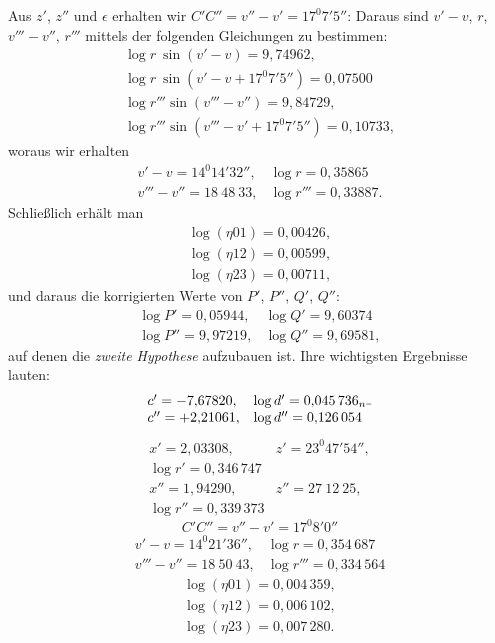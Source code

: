 Aus $z'$, $z''$ und $\epsilon$ erhalten wir $C'C'' = v''-v' = 17^{0}7'5''$: Daraus
sind $v'-v$, $r$, $v'''-v''$, $r'''$ mittels der folgenden Gleichungen zu bestimmen:
\[
\begin{array}{l}
\log r\ \sin(v'-v) = 9{,}74962, \\ \log r\ \sin(v'-v+17^{0}7'5'') = 0{,}07500 \\
\log r'''\sin(v'''-v'') = 9{,}84729, \\ \log r'''\sin(v'''-v'+17^{0}7'5'') = 0{,}10733,
\end{array}
\]
woraus wir erhalten
\[
\begin{array}{ll}
v'-v = 14^{0}14'32'', & \log r = 0{,}35865 \\
v'''-v'' = 18\ 48\ 33, & \log r''' = 0{,}33887.
\end{array}
\]
Schließlich erhält man
\[
\begin{gathered}
\log(\eta 01) = 0{,}00426, \\ \log(\eta 12) = 0{,}00599, \\ \log(\eta 23) = 0{,}00711,
\end{gathered}
\]
und daraus die korrigierten Werte von $P'$, $P''$, $Q'$, $Q''$:
\[
\begin{array}{ll}
\log P' = 0{,}05944, & \log Q' = 9{,}60374 \\
\log P'' = 9{,}97219, & \log Q'' = 9{,}69581,
\end{array}
\]
auf denen die \emph{zweite Hypothese} aufzubauen ist. Ihre wichtigsten Ergebnisse
lauten:
\[
\begin{array}{ll}
c' = -7{,}67820, & \log d' = 0{,}045\,736_n\mathord{\rule[.1ex]{.35em}{.35pt}} \\
c'' = +2{,}21061, & \log d'' = 0{,}126\,054
\end{array}
\]
\[
\begin{array}{ll}
x' = 2{,}03308, & z' = 23^{0}47'54'',\\
\log r' = 0{,}346\,747 & \\
x'' = 1{,}94290, & z'' = 27\ 12\ 25,\\
\log r'' = 0{,}339\,373 & 
\end{array}
\]
\[
C'C'' = v''-v' = 17^{0}8'0''
\]
\[
\begin{array}{ll}
v'-v = 14^{0}21'36'', & \log r = 0{,}354\,687 \\
v'''-v'' = 18\ 50\ 43, & \log r''' = 0{,}334\,564
\end{array}
\]
\[
\begin{gathered}
\log(\eta 01) = 0{,}004\,359, \\ \log(\eta 12) = 0{,}006\,102, \\ \log(\eta 23) = 0{,}007\,280.
\end{gathered}
\]
